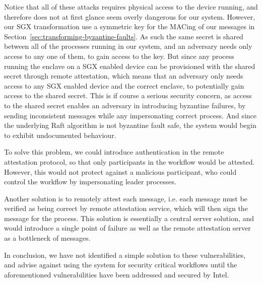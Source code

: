 \documentclass{article}
\begin{document}
	Notice that all of these attacks requires physical access to the device running, and therefore does not at first glance seem overly dangerous for our system.
	However, our SGX transformation use a symmetric key for the MACing of our messages in Section~\ref{sec:transforming-byzantine-faults}.
	As such the same secret is shared between all of the processes running in our system, and an adversary needs only access to any one of them, to gain access to the key.
	But since any process running the enclave on a SGX enabled device can be provisioned with the shared secret through remote attestation, which means that an adversary only needs access to any SGX enabled device and the correct enclave, to potentially gain access to the shared secret.
	This is if course a serious security concern, as access to the shared secret enables an adversary in introducing byzantine failures, by sending inconsistent messages while any impersonating correct process.
	And since the underlying Raft algorithm is not byzantine fault safe, the system would begin to exhibit undocumented behaviour.

	To solve this problem, we could introduce authentication in the remote attestation protocol, so that only participants in the workflow would be attested.
	However, this would not protect against a malicious participant, who could control the workflow by impersonating leader processes.

	Another solution is to remotely attest each message, i.e. each message must be verified as being correct by remote attestation service, which will then sign the message for the process.
	This solution is essentially a central server solution, and would introduce a single point of failure as well as the remote attestation server as a bottleneck of messages.

	In conclusion, we have not identified a simple solution to these vulnerabilities, and advise against using the system for security critical workflows until the aforementioned vulnerabilities have been addressed and secured by Intel.

\end{document}
